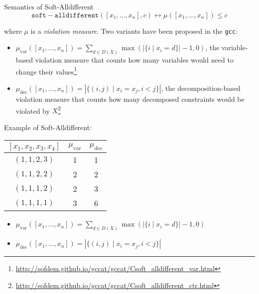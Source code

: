\documentclass[10pt,xcolor={dvipsnames},fleqn]{beamer}
\begin{document}
\begin{frame}[fragile]{Semantics of Soft-Alldifferent}
\[ 
\mathtt{soft-alldifferent}([x_1, \ldots, x_n], c) \leftrightarrow \mu([x_1, \ldots, x_n]) \leq c
\]
\vspace*{2ex}

where $\mu$ is a \emph{violation measure}. Two variants have been proposed in the \texttt{gcc}:

\begin{itemize}
\item $\mu_{\textrm{var}}([x_1, \ldots, x_n]) =  \sum_{d \in D(X)} \max (|\{i \mid x_i = d\}|-1, 0)$, the variable-based violation
measure that counts how many variables would need to change their values\footnote{\url{http://sofdem.github.io/gccat/gccat/Csoft_alldifferent_var.html}}
\item $\mu_{\textrm{dec}}([x_1, \ldots, x_n]) =  |\{ (i,j) \mid x_i = x_j, i < j \} | $, the decomposition-based violation
measure that counts how many decomposed constraints would be violated by $X$\footnote{\url{http://sofdem.github.io/gccat/gccat/Csoft_alldifferent_ctr.html}}
\end{itemize}
\end{frame}

\begin{frame}[fragile]{Example of Soft-Alldifferent: }

\begin{center}

\begin{tabular}{c|c|c}
$[x_1, x_2, x_3, x_4]$ & $\mu_{\mathrm{var}}$ & $\mu_{\mathrm{dec}}$ \\ 
\hline 
$(1,1,2,3)$ & 1 & 1 \\ 
$(1,1,2,2)$ & 2 & 2 \\ 
$(1,1,1,2)$ & 2 & 3 \\ 
$(1,1,1,1)$ & 3 & 6 \\ 
\hline 
\end{tabular} 

\end{center}

\begin{itemize}
\item $\mu_{\textrm{var}}([x_1, \ldots, x_n]) =  \sum_{d \in D(X)} \max (|\{i \mid x_i = d\}|-1, 0)$
\item $\mu_{\textrm{dec}}([x_1, \ldots, x_n]) =  |\{ (i,j) \mid x_i = x_j, i < j \} | $
\end{itemize}
\end{frame}
\end{document}
